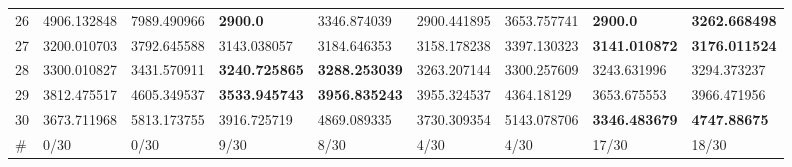 \begin{table*}[t]
\begin{tabular}{|p{0.8cm}|p{1.6cm}|p{1.6cm}|p{1.6cm}|p{1.6cm}|p{1.6cm}|p{1.6cm}|p{1.6cm}|p{1.6cm}|}
26  & 4906.132848 & 7989.490966 & \textbf{2900.0} & 3346.874039 & 2900.441895 & 3653.757741 & \textbf{2900.0} & \textbf{3262.668498} \\ 
27  & 3200.010703 & 3792.645588 & 3143.038057 & 3184.646353 & 3158.178238 & 3397.130323 & \textbf{3141.010872} & \textbf{3176.011524} \\ 
28  & 3300.010827 & 3431.570911 & \textbf{3240.725865} & \textbf{3288.253039} & 3263.207144 & 3300.257609 & 3243.631996 & 3294.373237 \\ 
29  & 3812.475517 & 4605.349537 & \textbf{3533.945743} & \textbf{3956.835243} & 3955.324537 & 4364.18129 & 3653.675553 & 3966.471956 \\ 
30  & 3673.711968 & 5813.173755 & 3916.725719 & 4869.089335 & 3730.309354 & 5143.078706 & \textbf{3346.483679} & \textbf{4747.88675} \\ 
\hline
\#  & 0/30 & 0/30 & 9/30 & 8/30 & 4/30 & 4/30 & 17/30 & 18/30 \\
\hline

\end{tabular}
\end{table*}

